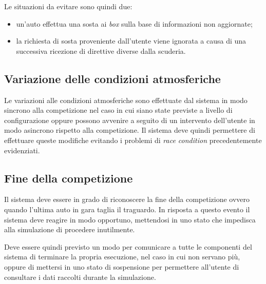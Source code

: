 Le situazioni da evitare sono quindi due:
\begin{itemize}
\item un'auto effettua una sosta ai \textit{box} sulla base di informazioni non aggiornate;
\item la richiesta di sosta proveniente dall'utente viene ignorata a causa di una successiva ricezione di direttive diverse dalla scuderia.
\end{itemize}

\subsection*{Variazione delle condizioni atmosferiche}
Le variazioni alle condizioni atmosferiche sono effettuate dal sistema in modo sincrono alla competizione nel caso in cui siano state previste a livello di configurazione oppure possono avvenire a seguito di un intervento dell'utente in modo asincrono rispetto alla competizione. Il sistema deve quindi permettere di effettuare queste modifiche evitando i problemi di \textit{race condition} precedentemente evidenziati.

\subsection*{Fine della competizione}
Il sistema deve essere in grado di riconoscere la fine della competizione ovvero quando l'ultima auto in gara taglia il traguardo. In risposta a questo evento il sistema deve reagire in modo opportuno, mettendosi in uno stato che impedisca alla simulazione di procedere inutilmente.

Deve essere quindi previsto un modo per comunicare a tutte le componenti del sistema di terminare la propria esecuzione, nel caso in cui non servano più, oppure di mettersi in uno stato di sospensione per permettere all'utente di consultare i dati raccolti durante la simulazione.
